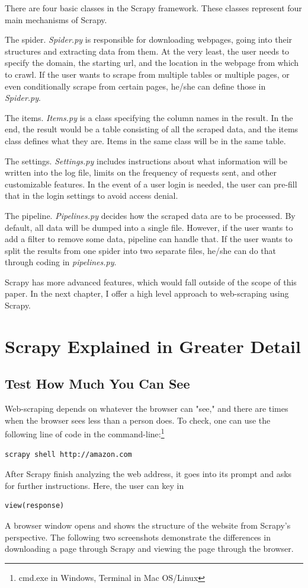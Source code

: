 \documentclass[12pt,twoside,draft]{report}
\begin{document}
There are four basic classes in the Scrapy framework. These classes represent four main mechanisms of Scrapy. 

The spider. \textit{Spider.py} is responsible for downloading webpages, going into their structures and extracting data from them. At the very least, the user needs to specify the domain, the starting url, and the location in the webpage from which to crawl. If the user wants to scrape from multiple tables or multiple pages, or even conditionally scrape from certain pages, he/she can define those in \textit{Spider.py}.

The items. \textit{Items.py} is a class specifying the column names in the result. In the end, the result would be a table consisting of all the scraped data, and the items class defines what they are. Items in the same class will be in the same table.

The settings. \textit{Settings.py} includes instructions about what information will be written into the log file, limits on the frequency of requests sent, and other customizable features. In the event of a user login is needed, the user can pre-fill that in the login settings to avoid access denial.

The pipeline. \textit{Pipelines.py} decides how the scraped data are to be processed. By default, all data will be dumped into a single file. However, if the user wants to add a filter to remove some data, pipeline can handle that. If the user wants to split the results from one spider into two separate files, he/she can do that through coding in \textit{pipelines.py}.

Scrapy has more advanced features, which would fall outside of the scope of this paper. In the next chapter, I offer a high level approach to web-scraping using Scrapy.

\cleardoublepage
\chapter{Scrapy Explained in Greater Detail}

\section{Test How Much You Can See}
Web-scraping depends on whatever the browser can "see," and there are times when the browser sees less than a person does. To check, one can use the following line of code in the command-line:\footnote{cmd.exe in Windows, Terminal in Mac OS/Linux} 
\begin{lstlisting}
scrapy shell http://amazon.com
\end{lstlisting}
After Scrapy finish analyzing the web address, it goes into its prompt and asks for further instructions. Here, the user can key in 
\begin{lstlisting}
view(response)
\end{lstlisting} 
A browser window opens and shows the structure of the website from Scrapy's perspective. The following two screenshots demonstrate the differences in downloading a page through Scrapy and viewing the page through the browser. 
\end{document}
